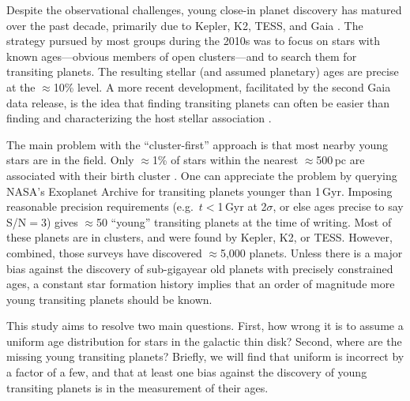 \documentclass[11pt,twocolumn,tighten]{aastex63}
\begin{document}
Despite the observational challenges, young close-in planet discovery
has matured over the past decade, primarily due to Kepler, K2, TESS,
and Gaia
\citep[e.g.][]{Meibom_2013,Mann_K2_25_2016,Mann_2017,Curtis_2018,Livingston_2018,David_2019,Bouma_2020_toi837,Rizzuto_2020,Plavchan_2020,Newton_2021,Nardiello_2022,Tofflemire_2021,Barber_2022,Bouma_2022a,Bouma_2022b,Zhou_2022,Zakhozhay_2022,Wood_2023}.
The strategy pursued by most groups during the 2010s was to focus on
stars with known ages---obvious members of open clusters---and to
search them for transiting planets.  The resulting stellar (and
assumed planetary) ages are precise at the $\approx$10\% level.  A
more recent development, facilitated by the second Gaia data release,
is the idea that finding transiting planets can often be easier than
finding and characterizing the host stellar association
\citep[e.g.][]{Tofflemire_2021}.

The main problem with the ``cluster-first'' approach is that most
nearby young stars are in the field.  Only $\approx$1\% of stars
within the nearest $\approx$500\,pc are associated with their birth
cluster
\citep[e.g.][]{Zari_2018,CantatGaudin_2020,Kounkel_2020,Kerr_2021}.
One can appreciate the problem by querying NASA's Exoplanet Archive
\citep[NEA;][]{2013PASP..125..989A} for transiting planets younger
than 1\,Gyr.  Imposing reasonable precision requirements
(e.g.~$t$$<$1\,Gyr at 2$\sigma$, or else ages precise to say S/N$=$3)
gives $\approx$50 ``young'' transiting planets at the time of writing.
Most of these planets are in clusters, and were found by Kepler, K2,
or TESS.  However, combined, those surveys have discovered
$\approx$5{,}000 planets.  Unless there is a major bias against the
discovery of sub-gigayear old planets with precisely constrained ages,
a constant star formation history implies that an order of magnitude
more young transiting planets should be known.

This study aims to resolve two main questions.  First, how wrong it is
to assume a uniform age distribution for stars in the galactic thin
disk?  Second, where are the missing young transiting planets?
Briefly, we will find that uniform is incorrect by a factor of a few,
and that at least one bias against the discovery of young transiting
planets is in the measurement of their ages.
\end{document}
